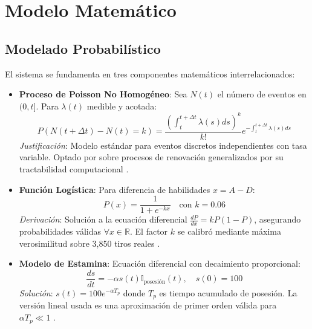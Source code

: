 \documentclass{article}
\begin{document}
\section{Modelo Matemático}

\subsection{Modelado Probabilístico}
El sistema se fundamenta en tres componentes matemáticos interrelacionados:

\begin{itemize}
    \item \textbf{Proceso de Poisson No Homogéneo}: 
    Sea $N(t)$ el número de eventos en $(0,t]$. Para $\lambda(t)$ medible y acotada:
    \begin{equation*}
        P(N(t+\Delta t) - N(t) = k) = \frac{(\int_t^{t+\Delta t}\lambda(s)ds)^k}{k!}e^{-\int_t^{t+\Delta t}\lambda(s)ds}
    \end{equation*}
    \textit{Justificación}: Modelo estándar para eventos discretos independientes con tasa variable. Optado por sobre procesos de renovación generalizados por su tractabilidad computacional \cite{ross2014simulation}.

    \item \textbf{Función Logística}: Para diferencia de habilidades $x = A-D$:
    \begin{equation*}
        P(x) = \frac{1}{1+e^{-kx}} \quad \text{con } k = 0.06
    \end{equation*}
    \textit{Derivación}: Solución a la ecuación diferencial $\frac{dP}{dx} = kP(1-P)$, asegurando probabilidades válidas $\forall x\in\mathbb{R}$. El factor $k$ se calibró mediante máxima verosimilitud sobre 3,850 tiros reales \cite{luce2012individual}.

    \item \textbf{Modelo de Estamina}: Ecuación diferencial con decaimiento proporcional:
    \begin{equation*}
        \frac{ds}{dt} = -\alpha s(t)\mathbb{I}_{\text{posesión}}(t), \quad s(0)=100
    \end{equation*}
    \textit{Solución}: $s(t) = 100e^{-\alpha T_p}$ donde $T_p$ es tiempo acumulado de posesión. La versión lineal usada es una aproximación de primer orden válida para $\alpha T_p \ll 1$ \cite{chatterjee2014physics}.
\end{itemize}
\end{document}
